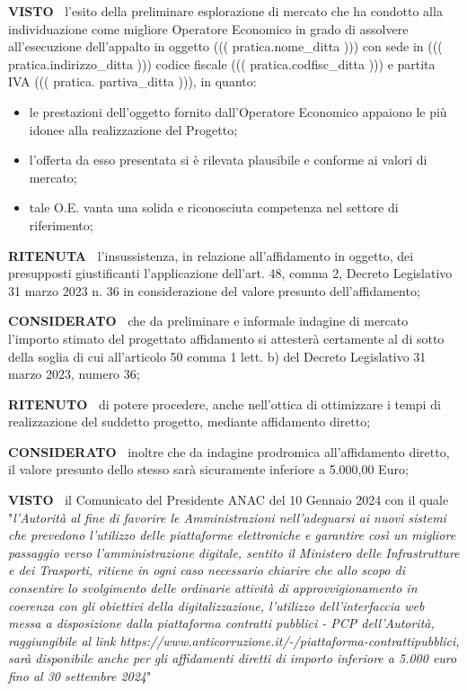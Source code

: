 \documentclass[a4paper,12pt]{letter}
\begin{document}
\textbf{VISTO~} l’esito della preliminare
esplorazione di mercato che ha condotto alla individuazione come migliore
Operatore Economico in grado di assolvere all’esecuzione dell’appalto
in oggetto ((( pratica.nome_ditta ))) con sede in ((( pratica.indirizzo_ditta )))
codice fiscale ((( pratica.codfisc_ditta ))) e partita IVA ((( pratica. partiva_ditta ))),
in quanto:

\begin{itemize}
\item  le prestazioni dell’oggetto fornito dall’Operatore Economico
appaiono le più idonee alla realizzazione del Progetto;

\item 
l’offerta da esso presentata si è rilevata plausibile e conforme
ai valori di mercato;

\item tale O.E. vanta una solida e riconosciuta
competenza nel settore di riferimento;

\end{itemize}

\textbf{RITENUTA~}  l’insussistenza, in relazione
all’affidamento in oggetto, dei presupposti giustificanti
l’applicazione dell’art. 48, comma 2, Decreto Legislativo 31 marzo
2023 n. 36  in considerazione del valore presunto dell’affidamento; 

\textbf{CONSIDERATO~} che da preliminare e informale indagine
di mercato l’importo stimato del progettato affidamento si attesterà
certamente al di sotto della soglia di cui all’articolo 50 comma 1
lett. b) del Decreto Legislativo 31 marzo 2023, numero 36;

\textbf{RITENUTO~} di potere procedere, anche nell’ottica di
ottimizzare i tempi di realizzazione del suddetto progetto, mediante
affidamento diretto;

\textbf{CONSIDERATO~}  inoltre che da indagine prodromica
all’affidamento diretto, il valore presunto dello stesso sarà
sicuramente inferiore a 5.000,00 Euro;

\textbf{VISTO~} il Comunicato del Presidente ANAC
del 10 Gennaio 2024 con il quale "\textit{l’Autorità al fine di favorire
le Amministrazioni nell’adeguarsi ai nuovi sistemi che prevedono
l’utilizzo delle piattaforme elettroniche e garantire così un migliore
passaggio verso l’amministrazione digitale, sentito il Ministero
delle Infrastrutture e dei Trasporti, ritiene in ogni caso necessario
chiarire che allo scopo di consentire lo svolgimento delle ordinarie
attività di approvvigionamento in coerenza con gli obiettivi della
digitalizzazione, l’utilizzo dell’interfaccia web messa a disposizione
dalla piattaforma contratti pubblici - PCP dell’Autorità, raggiungibile
al link https://www.anticorruzione.it/-/piattaforma-contrattipubblici,
sarà disponibile anche per gli affidamenti diretti di importo inferiore
a 5.000 euro fino al 30 settembre 2024}"
\end{document}
